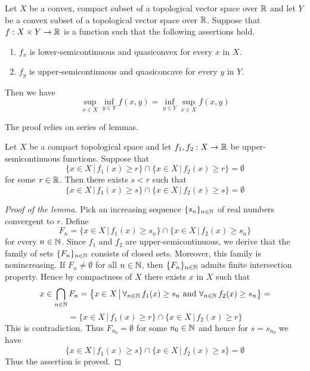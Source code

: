 \begin{theorem}\label{theorem:sionsminimax}
Let $X$ be a convex, compact subset of a topological vector space over ${\mathbb R}$ and let $Y$ be a convex subset of a topological vector space over ${\mathbb R}$. Suppose that $f:X\times Y\rightarrow {\mathbb R}$ is a function such that the following assertions hold.
\begin{enumerate}[label=\emph{\textbf{(\arabic*)}}, leftmargin=3.0em]
\item $f_x$ is lower-semicontinuous and quasiconvex for every $x$ in $X$.
\item $f_y$ is upper-semicontinuous and quasiconcave for every $y$ in $Y$.
\end{enumerate}
Then we have
$$\sup_{x\in X}\inf_{y\in Y}f(x,y) = \inf_{y\in Y}\sup_{x\in X}f(x,y)$$
\end{theorem}
\noindent
The proof relies on series of lemmas.

\begin{lemma}\label{lemma:levelcangodown}
Let $X$ be a compact topological space and let $f_1,f_2:X\rightarrow {\mathbb R}$ be upper-semicontinuous functions. Suppose that
$$\big\{x\in X\,\big|\,f_{1}(x)\geq r\big\}\cap \big\{x\in X\,\big|\,f_{2}(x)\geq r\big\}=\emptyset$$
for some $r\in {\mathbb R}$. Then there exists $s< r$ such that
$$\big\{x\in X\,\big|\,f_{1}(x)\geq s\big\}\cap \big\{x\in X\,\big|\,f_{2}(x)\geq s\big\}=\emptyset$$
\end{lemma}
\begin{proof}[Proof of the lemma]
Pick an increasing sequence $\{s_n\}_{n\in {\mathbb N}}$ of real numbers convergent to $r$. Define
$$F_n = \big\{x\in X\,\big|\,f_{1}(x)\geq s_n\big\}\cap \big\{x\in X\,\big|\,f_{2}(x)\geq s_n\big\}$$
for every $n\in {\mathbb N}$. Since $f_{1}$ and $f_{2}$ are upper-semicontinuous, we derive that the family of sets $\{F_n\}_{n\in {\mathbb N}}$ consists of closed sets. Moreover, this family is nonincreasing. If $F_n\neq \emptyset$ for all $n\in {\mathbb N}$, then $\{F_n\}_{n\in {\mathbb N}}$ admits finite intersection property. Hence by compactness of $X$ there exists $x$ in $X$ such that
$$x\in \bigcap_{n\in {\mathbb N}}F_n = \big\{x\in X\,\big|\,\forall_{n\in {\mathbb N}}\,f_1(x)\geq s_n\mbox{ and }\forall_{n\in {\mathbb N}}\,f_2(x)\geq s_n\big\} =$$
$$= \big\{x\in X\,\big|\,f_{1}(x)\geq r\big\}\cap \big\{x\in X\,\big|\,f_{2}(x)\geq r\big\}$$
This is contradiction. Thus $F_{n_0}=\emptyset$ for some $n_0\in {\mathbb N}$ and hence for $s = s_{n_0}$ we have
$$\big\{x\in X\,\big|\,f_{1}(x)\geq s\big\}\cap \big\{x\in X\,\big|\,f_{2}(x)\geq s\big\} = \emptyset$$
Thus the assertion is proved.
\end{proof}

